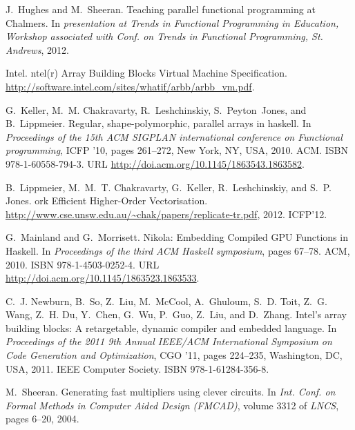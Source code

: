 \documentclass{sigplanconf}
\begin{document}
\begin{thebibliography}{}
J.~Hughes and M.~Sheeran.
\newblock Teaching parallel functional programming at {C}halmers.
\newblock In \emph{presentation at Trends in Functional Programming in
  Education, Workshop associated with Conf. on Trends in Functional
  Programming, St. Andrews}, 2012.

Intel.
ntel(r) {A}rray {B}uilding {B}locks {V}irtual {M}achine
  {S}pecification.
\newblock \url{http://software.intel.com/sites/whatif/arbb/arbb_vm.pdf}.

G.~Keller, M.~M. Chakravarty, R.~Leshchinskiy, S.~Peyton~Jones, and
  B.~Lippmeier.
\newblock Regular, shape-polymorphic, parallel arrays in haskell.
\newblock In \emph{Proceedings of the 15th ACM SIGPLAN international conference
  on Functional programming}, ICFP '10, pages 261--272, New York, NY, USA,
  2010. ACM.
\newblock ISBN 978-1-60558-794-3.
\newblock URL \url{http://doi.acm.org/10.1145/1863543.1863582}.

B.~Lippmeier, M.~M.~T. Chakravarty, G.~Keller, R.~Leshchinskiy, and S.~P.
  Jones.
ork {E}fficient {H}igher-{O}rder {V}ectorisation.
\newblock \url{http://www.cse.unsw.edu.au/~chak/papers/replicate-tr.pdf}, 2012.
\newblock ICFP'12.

G.~Mainland and G.~{M}orrisett.
\newblock Nikola: {E}mbedding {C}ompiled {GPU} {F}unctions in {H}askell.
\newblock In \emph{Proceedings of the third ACM Haskell symposium}, pages
  67--78. ACM, 2010.
\newblock ISBN 978-1-4503-0252-4.
\newblock URL \url{http://doi.acm.org/10.1145/1863523.1863533}.

C.~J. Newburn, B.~So, Z.~Liu, M.~McCool, A.~Ghuloum, S.~D. Toit, Z.~G. Wang,
  Z.~H. Du, Y.~Chen, G.~Wu, P.~Guo, Z.~Liu, and D.~Zhang.
\newblock Intel's array building blocks: A retargetable, dynamic compiler and
  embedded language.
\newblock In \emph{Proceedings of the 2011 9th Annual IEEE/ACM International
  Symposium on Code Generation and Optimization}, CGO '11, pages 224--235,
  Washington, DC, USA, 2011. IEEE Computer Society.
\newblock ISBN 978-1-61284-356-8.

M.~Sheeran.
\newblock Generating fast multipliers using clever circuits.
\newblock In \emph{Int. Conf. on Formal Methods in Computer Aided Design
  (FMCAD)}, volume 3312 of \emph{LNCS}, pages 6--20, 2004.


\end{thebibliography}
\end{document}
